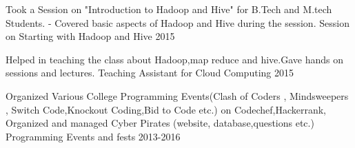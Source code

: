 \begin{cventries}
  \cventry
    {Took a Session on "Introduction to Hadoop and Hive" for B.Tech and M.tech Students. 
- Covered basic aspects of Hadoop and Hive during the session.}
    {Session on Starting with Hadoop and Hive }
    {}
    {2015}
    {
      \begin{cvitems}
        \item []
      \end{cvitems}
    }
    \cventry
    {Helped in teaching the class about Hadoop,map reduce and hive.Gave hands on sessions and lectures. }
    {Teaching Assistant for Cloud Computing}
    {}
    {2015}
    {
      \begin{cvitems}
        \item []
      \end{cvitems}
    }
    \cventry
    {Organized Various College Programming Events(Clash of Coders , Mindsweepers , Switch Code,Knockout Coding,Bid to Code etc.) on Codechef,Hackerrank, Organized and managed Cyber Pirates (website, database,questions etc.)}
    {Programming Events and fests}
    {}
    {2013-2016}
    {
      \begin{cvitems}
        \item []
      \end{cvitems}
    }
\end{cventries}
